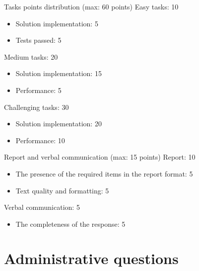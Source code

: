 \documentclass{beamer}
\begin{document}
\begin{frame}{Tasks points distribution (max: 60 points)}
    Easy tasks: 10
    \begin{itemize}
        \item Solution implementation: 5
        \item Tests passed: 5
    \end{itemize}
    Medium tasks: 20
    \begin{itemize}
        \item Solution implementation: 15
        \item Performance: 5
    \end{itemize}
    Challenging tasks: 30
    \begin{itemize}
        \item Solution implementation: 20
        \item Performance: 10
    \end{itemize}
\end{frame}

\begin{frame}{Report and verbal communication (max: 15 points)}
    Report: 10
    \begin{itemize}
        \item The presence of the required items in the report format: 5
        \item Text quality and formatting: 5
    \end{itemize}
    Verbal communication: 5
    \begin{itemize}
        \item The completeness of the response: 5
    \end{itemize}
\end{frame}

\section{Administrative questions}
\end{document}
